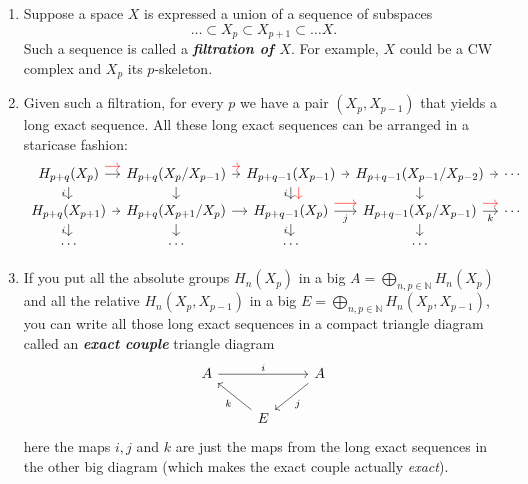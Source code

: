 \begin{enumerate}
	\item Suppose a space $X$ is expressed a union of a sequence of subspaces
		\[\ldots\subset X_p\subset X_{p+1}\subset \ldots X.\]
		Such a sequence is called a \textit{\textbf{filtration of $X$}}. For example, $X$ could be a CW complex and $X_p$ its $p$-skeleton.

	\item Given such a filtration, for every $p$ we have a pair $(X_p,X_{p-1})$ that yields a long exact sequence. All these long exact sequences can be arranged in a staricase fashion:
\[\begin{tikzcd}[column sep=tiny,row sep=small]
	H_{p+q}(X_p)\arrow[r]\arrow[d,"i",swap]\arrow[r,red,shift={(0,0.2)}]&H_{p+q}(X_p/X_{p-1})\arrow[r]\arrow[r,red,shift={(0,0.2)}]\arrow[d]&H_{p+q-1}(X_{p-1})\arrow[r]\arrow[d,red,shift={(0.2,0)}]\arrow[d,"i",swap]&H_{p+q-1}(X_{p-1}/X_{p-2})\arrow[d]\arrow[r]&\cdots\\
	H_{p+q}(X_{p+1})\arrow[r]\arrow[d,"i",swap]&H_{p+q}(X_{p+1}/X_{p})\arrow[r]\arrow[d]&H_{p+q-1}(X_{p})\arrow[r,"j",swap]\arrow[r,red,shift={(0,0.2)}]\arrow[d,"i",swap]&H_{p+q-1}(X_{p}/X_{p-1})\arrow[r,red,shift={(0,0.2)}]\arrow[d]\arrow[r,"k",swap]&\cdots\\
	\cdots&\cdots&\cdots&\cdots
\end{tikzcd}\]
	\item If you put all the absolute groups $H_n(X_p)$ in a big $A=\bigoplus_{n,p\in \mathbb{N}}H_n(X_p)$ and all the relative $H_n(X_p,X_{p-1})$ in a big $E=\bigoplus_{n,p\in \mathbb{N}}H_n(X_p,X_{p-1})$, you can write all those long exact sequences in a compact triangle diagram called an \textit{\textbf{exact couple}} triangle diagram
	\[
	\begin{tikzcd}
		A\arrow[rr,"i"]&&A\arrow[dl,"j"]\\
		&E\arrow[ul,"k"]
	\end{tikzcd}
\]
here the maps $i,j$ and $k$ are just the maps from the long exact sequences in the other big diagram (which makes the exact couple actually \textit{exact}).


\end{enumerate}
